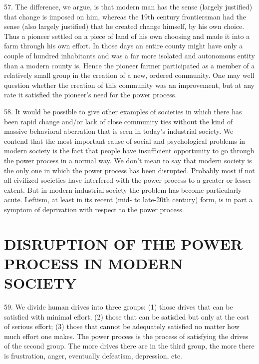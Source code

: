 \documentclass{article}
\begin{document}
57. The difference, we argue, is that modern man has the sense (largely justified) that change is 
imposed on him, whereas the 19th century frontiersman had the sense (also largely justified) that 
he created change himself, by his own choice. Thus a pioneer settled on a piece of land of his own 
choosing and made it into a farm through his own effort. In those days an entire county might 
have only a couple of hundred inhabitants and was a far more isolated and autonomous entity than 
a modern county is. Hence the pioneer farmer participated as a member of a relatively small group 
in the creation of a new, ordered community. One may well question whether the creation of this 
community was an improvement, but at any rate it satisfied the pioneer’s need for the power 
process. \vspace{\baselineskip}

58. It would be possible to give other examples of societies in which there has been rapid change 
and/or lack of close community ties without the kind of massive behavioral aberration that is seen 
in today’s industrial society. We contend that the most important cause of social and psychological 
problems in modern society is the fact that people have insufficient opportunity to go through the 
power process in a normal way. We don’t mean to say that modern society is the only one in 
which the power process has been disrupted. Probably most if not all civilized societies have 
interfered with the power process to a greater or lesser extent. But in modern industrial society 
the problem has become particularly acute. Leftism, at least in its recent (mid- to late-20th century) 
form, is in part a symptom of deprivation with respect to the power process. 


\section{DISRUPTION OF THE POWER PROCESS IN MODERN SOCIETY}

\hspace{0.5cm} 59. We divide human drives into three groups: (1) those drives that can be satisfied with minimal 
effort; (2) those that can be satisfied but only at the cost of serious effort; (3) those that cannot be 
adequately satisfied no matter how much effort one makes. The power process is the process of 
satisfying the drives of the second group. The more drives there are in the third group, the more 
there is frustration, anger, eventually defeatism, depression, etc. \vspace{\baselineskip}
\end{document}

